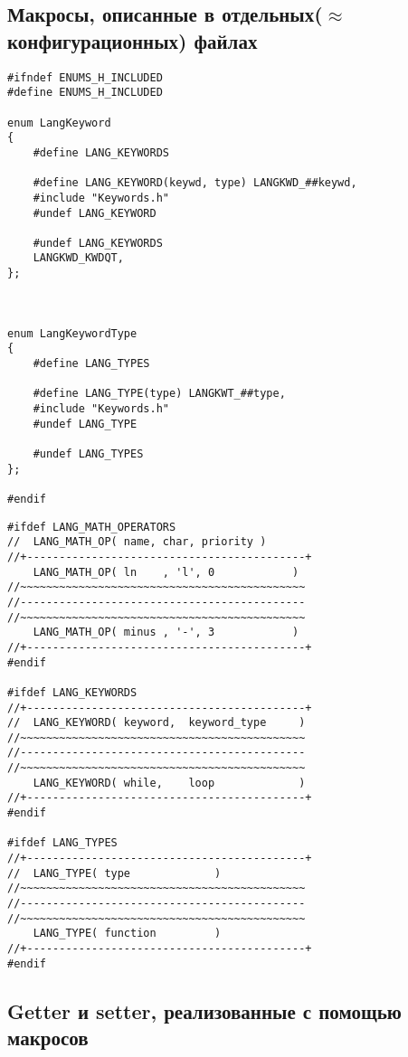 \documentclass[a4paper]{article}
\begin{document}
\subsection{Макросы, описанные в отдельных($\approx$ конфигурационных) файлах}


	\begin{lstlisting}[caption={Файл Enums.h, использующий макросы, описанные в Keywords.h}]
#ifndef ENUMS_H_INCLUDED
#define ENUMS_H_INCLUDED

enum LangKeyword 
{
    #define LANG_KEYWORDS
    
    #define LANG_KEYWORD(keywd, type) LANGKWD_##keywd,
    #include "Keywords.h"
    #undef LANG_KEYWORD
    
    #undef LANG_KEYWORDS
    LANGKWD_KWDQT,
};



enum LangKeywordType
{
    #define LANG_TYPES
    
    #define LANG_TYPE(type) LANGKWT_##type,
    #include "Keywords.h"
    #undef LANG_TYPE
    
    #undef LANG_TYPES
};

#endif
	\end{lstlisting} 
	\begin{lstlisting}[caption={Файл, использующий макросы, описанные в Keywords.h}]
#ifdef LANG_MATH_OPERATORS 
//  LANG_MATH_OP( name, char, priority )
//+-------------------------------------------+
    LANG_MATH_OP( ln    , 'l', 0            )
//~~~~~~~~~~~~~~~~~~~~~~~~~~~~~~~~~~~~~~~~~~~~
//--------------------------------------------
//~~~~~~~~~~~~~~~~~~~~~~~~~~~~~~~~~~~~~~~~~~~~
    LANG_MATH_OP( minus , '-', 3            )
//+-------------------------------------------+
#endif

#ifdef LANG_KEYWORDS
//+-------------------------------------------+
//  LANG_KEYWORD( keyword,  keyword_type     )
//~~~~~~~~~~~~~~~~~~~~~~~~~~~~~~~~~~~~~~~~~~~~
//--------------------------------------------
//~~~~~~~~~~~~~~~~~~~~~~~~~~~~~~~~~~~~~~~~~~~~
    LANG_KEYWORD( while,    loop             )
//+-------------------------------------------+ 
#endif

#ifdef LANG_TYPES
//+-------------------------------------------+
//  LANG_TYPE( type             )
//~~~~~~~~~~~~~~~~~~~~~~~~~~~~~~~~~~~~~~~~~~~~
//--------------------------------------------
//~~~~~~~~~~~~~~~~~~~~~~~~~~~~~~~~~~~~~~~~~~~~
    LANG_TYPE( function         )
//+-------------------------------------------+
#endif
\end{lstlisting} 
\subsection{Getter и setter, реализованные с помощью макросов}
	 
\end{document}
